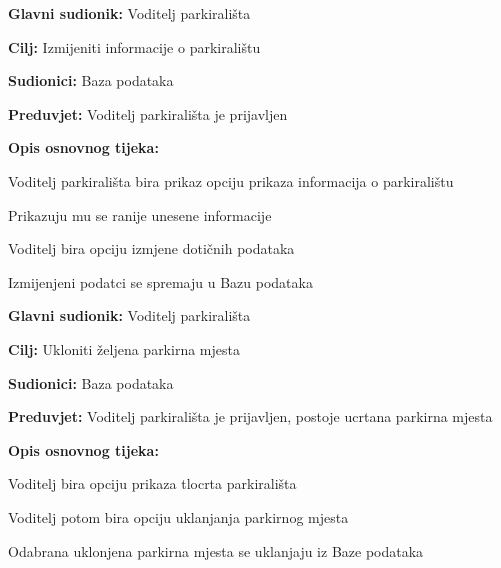                         \noindent {}
					\begin{packed_item}
	
						\item \textbf{Glavni sudionik: }Voditelj parkirališta
						\item  \textbf{Cilj:} Izmijeniti informacije o parkiralištu
						\item  \textbf{Sudionici:} Baza podataka
						\item  \textbf{Preduvjet:} Voditelj parkirališta je prijavljen
						\item  \textbf{Opis osnovnog tijeka:}
						
						\item[] \begin{packed_enum}
	
							\item Voditelj parkirališta bira prikaz opciju prikaza informacija o parkiralištu
							\item Prikazuju mu se ranije unesene informacije
							\item Voditelj bira opciju izmjene dotičnih podataka 
                                \item Izmijenjeni podatci se spremaju u Bazu podataka
							
						\end{packed_enum}
					\end{packed_item}


                        \noindent {}
					\begin{packed_item}
	
						\item \textbf{Glavni sudionik: }Voditelj parkirališta
						\item  \textbf{Cilj:} Ukloniti željena parkirna mjesta
						\item  \textbf{Sudionici:} Baza podataka
						\item  \textbf{Preduvjet:} Voditelj parkirališta je prijavljen, postoje ucrtana parkirna mjesta
						\item  \textbf{Opis osnovnog tijeka:}
						
						\item[] \begin{packed_enum}
	
							\item Voditelj bira opciju prikaza tlocrta parkirališta
							\item Voditelj potom bira opciju uklanjanja parkirnog mjesta
							\item Odabrana uklonjena parkirna mjesta se uklanjaju iz Baze podataka
							
						\end{packed_enum}

        
					\end{packed_item}

